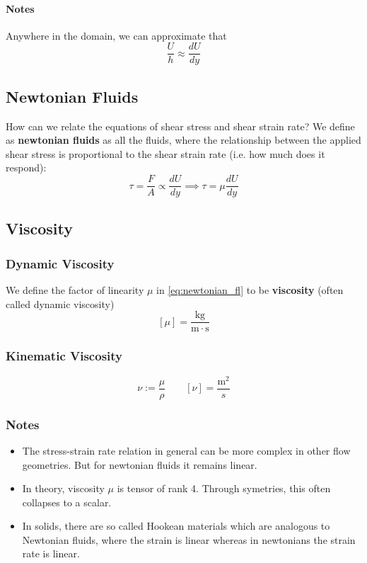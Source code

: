 \paragraph{Notes}
Anywhere in the domain, we can approximate that
$$
\frac Uh \approx\frac {dU}{dy}
$$
\subsection{Newtonian Fluids}
How can we relate the equations of shear stress and shear strain rate? 
We define as \textbf{newtonian fluids} as all the fluids, where the relationship between the applied shear stress is proportional to the shear strain rate (i.e. how much does it respond):
\begin{equation}
\tau = \frac FA \propto \frac {dU}{dy}\implies \tau = \mu \frac{dU}{dy}\label{eq:newtonian_fl}
\end{equation}

\subsection{Viscosity}

\subsubsection{Dynamic Viscosity}
We define the factor of linearity $\mu$ in \ref{eq:newtonian_fl} to be \textbf{viscosity} (often called dynamic viscosity)
$$
[\mu] = \frac {\mathrm{kg}}{\mathrm m\cdot \mathrm s}
$$

\subsubsection{Kinematic Viscosity}

$$
\nu := \frac \mu \rho\qquad [\nu] =\frac {\mathrm m^2}{s} 
$$
\subsubsection{Notes} 
\begin{itemize}
    \item The stress-strain rate relation in general can be more complex in other flow geometries. But for newtonian fluids it remains linear.
    \item In theory, viscosity $\mu$ is tensor of rank 4. Through symetries, this often collapses to a scalar.
    \item In solids, there are so called Hookean materials which are analogous to Newtonian fluids, where the strain is linear whereas in newtonians the strain rate is linear.
\end{itemize}
